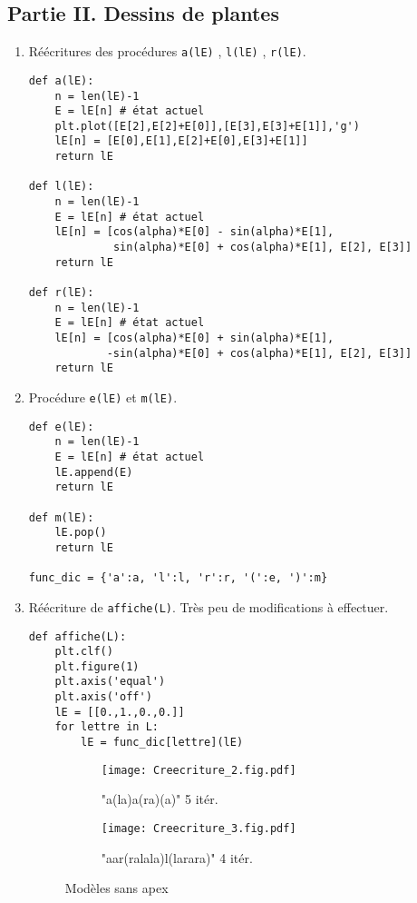 \subsection*{Partie II. Dessins de plantes}
\begin{enumerate}
 \item Réécritures des procédures \verb|a(lE)| , \verb|l(lE)| , \verb|r(lE)|.
\begin{verbatim}
def a(lE):
    n = len(lE)-1
    E = lE[n] # état actuel
    plt.plot([E[2],E[2]+E[0]],[E[3],E[3]+E[1]],'g')
    lE[n] = [E[0],E[1],E[2]+E[0],E[3]+E[1]] 
    return lE
    
def l(lE):
    n = len(lE)-1
    E = lE[n] # état actuel
    lE[n] = [cos(alpha)*E[0] - sin(alpha)*E[1],
             sin(alpha)*E[0] + cos(alpha)*E[1], E[2], E[3]]
    return lE

def r(lE):
    n = len(lE)-1
    E = lE[n] # état actuel
    lE[n] = [cos(alpha)*E[0] + sin(alpha)*E[1],
            -sin(alpha)*E[0] + cos(alpha)*E[1], E[2], E[3]]
    return lE
\end{verbatim}

\item Procédure \verb|e(lE)| et \verb|m(lE)|.
\begin{verbatim}
def e(lE):
    n = len(lE)-1
    E = lE[n] # état actuel
    lE.append(E)
    return lE

def m(lE):
    lE.pop()
    return lE
    
func_dic = {'a':a, 'l':l, 'r':r, '(':e, ')':m}
\end{verbatim}

\item Réécriture de \verb|affiche(L)|. Très peu de modifications à effectuer.
\begin{verbatim}
def affiche(L):
    plt.clf()
    plt.figure(1)
    plt.axis('equal')
    plt.axis('off')
    lE = [[0.,1.,0.,0.]]
    for lettre in L:
        lE = func_dic[lettre](lE)
\end{verbatim}
\begin{figure}
   \centering
   \begin{subfigure}[b]{6cm}
     \texttt{[image: Creecriture\_2.fig.pdf]}
     \caption{"a(la)a(ra)(a)" 5 itér.}
     \label{fig:Creecriture_2}
    \end{subfigure}
  \begin{subfigure}[b]{6cm}
    \texttt{[image: Creecriture\_3.fig.pdf]}
    \caption{"aar(ralala)l(larara)" 4 itér.}
    \label{fig:Creecriture_3}
   \end{subfigure}
   \caption{Modèles sans apex}
\end{figure}


\end{enumerate}
